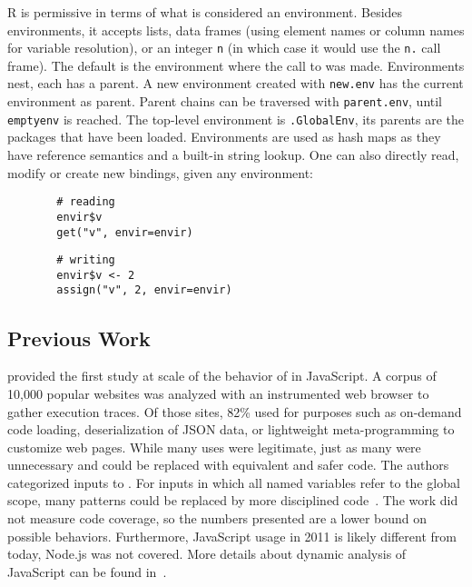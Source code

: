 \documentclass[acmsmall, screen]{acmart}
\renewcommand{\k}[1]{\lstinline |#1|\xspace}
\begin{document}
R is permissive in terms of what is considered an environment. Besides
environments, it accepts lists, data frames (using element names or column names
for variable resolution), or an integer \k{n} (in which case it would use the
\k{n.} call frame). The default is the environment where the call to \eval was
made.
%
Environments nest, each has a parent. A new environment created with \k{new.env}
has the current environment as parent. Parent chains can be traversed with
\k{parent.env}, until \k{emptyenv} is reached. The top-level environment is
\k{.GlobalEnv}, its parents are the packages that have been loaded. Environments
are used as hash maps as they have reference semantics and a built-in string
lookup. One can also directly read, modify or create new bindings, given any
environment:
%
\begin{figure}[H]
\begin{minipage}{.49\textwidth}
  \begin{lstlisting}
  # reading
  envir$v
  get("v", envir=envir)
  \end{lstlisting}
\end{minipage}
\begin{minipage}{.49\textwidth}
  \begin{lstlisting}
  # writing
  envir$v <- 2
  assign("v", 2, envir=envir)
  \end{lstlisting}
\end{minipage}
\end{figure}
%

\subsection{Previous Work}

\citet{ecoop11} provided the first study at scale of the behavior of \eval in
JavaScript. A corpus of 10,000 popular websites was analyzed with an
instrumented web browser to gather execution traces. Of those sites, 82\% used
\eval for purposes such as on-demand code loading, deserialization of JSON data,
or lightweight meta-programming to customize web pages. While many uses were
legitimate, just as many were unnecessary and could be replaced with equivalent
and safer code. The authors categorized inputs to \eval. For inputs in
which all named variables refer to the global scope, many patterns could be
replaced by more disciplined code~\cite{oopsla12b, moller12}. The work did not
measure code coverage, so the numbers presented are a lower bound on possible
behaviors. Furthermore, JavaScript usage in 2011 is likely different from today,
\eg Node.js was not covered. More details about dynamic analysis of JavaScript
can be found in~\cite{liang}.
\end{document}
